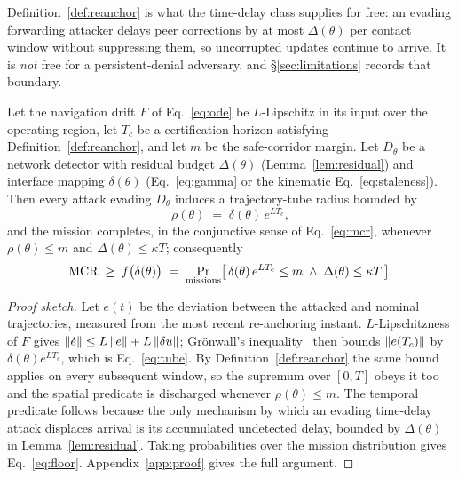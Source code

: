 Definition~\ref{def:reanchor} is what the time-delay class supplies for free: an
evading forwarding attacker delays peer corrections by at most $\Delta(\theta)$
per contact window without suppressing them, so uncorrupted updates continue to
arrive. It is \emph{not} free for a persistent-denial adversary, and
\S\ref{sec:limitations} records that boundary.

\begin{theorem}
\label{thm:main}
Let the navigation drift $F$ of Eq.~\eqref{eq:ode} be $L$-Lipschitz in its input
over the operating region, let $T_c$ be a certification horizon satisfying
Definition~\ref{def:reanchor}, and let $m$ be the safe-corridor margin. Let
$D_\theta$ be a network detector with residual budget $\Delta(\theta)$
(Lemma~\ref{lem:residual}) and interface mapping $\delta(\theta)$
(Eq.~\eqref{eq:gamma} or the kinematic Eq.~\eqref{eq:staleness}). Then every attack
evading $D_\theta$ induces a trajectory-tube radius bounded by
\begin{equation}
\label{eq:tube}
\rho(\theta) \;=\; \delta(\theta)\,e^{L T_c},
\end{equation}
and the mission completes, in the conjunctive sense of Eq.~\eqref{eq:mcr},
whenever $\rho(\theta)\le m$ and $\Delta(\theta)\le\kappa T$; consequently
\begin{equation}
\label{eq:floor}
\mathrm{MCR} \;\ge\; f\big(\delta(\theta)\big) \;=\;
\Pr_{\text{missions}}\!\big[\,\delta(\theta)\,e^{LT_c}\le m
\;\wedge\; \Delta(\theta)\le\kappa T\,\big].
\end{equation}
\end{theorem}
\begin{proof}[Proof sketch]
Let $e(t)$ be the deviation between the attacked and nominal trajectories,
measured from the most recent re-anchoring instant. $L$-Lipschitzness of $F$
gives $\left\lVert \dot e\right\rVert\le L\left\lVert e\right\rVert+L\left\lVert \delta u\right\rVert$; Gr\"onwall's
inequality~\cite{gronwall1919} then bounds $\left\lVert e(T_c)\right\rVert$ by
$\delta(\theta)e^{LT_c}$, which is Eq.~\eqref{eq:tube}. By
Definition~\ref{def:reanchor} the same bound applies on every subsequent window,
so the supremum over $[0,T]$ obeys it too and the spatial
predicate is discharged whenever $\rho(\theta)\le m$. The temporal predicate follows because
the only mechanism by which an evading time-delay attack displaces arrival is
its accumulated undetected delay, bounded by $\Delta(\theta)$ in
Lemma~\ref{lem:residual}. Taking probabilities over the mission distribution
gives Eq.~\eqref{eq:floor}. Appendix~\ref{app:proof} gives the full argument.
\end{proof}


